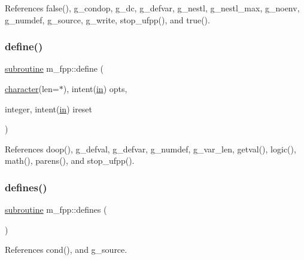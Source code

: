 References false(), g\+\_\+condop, g\+\_\+dc, g\+\_\+defvar, g\+\_\+nestl, g\+\_\+nestl\+\_\+max, g\+\_\+noenv, g\+\_\+numdef, g\+\_\+source, g\+\_\+write, stop\+\_\+ufpp(), and true().

\mbox{\label{namespacem__fpp_a43f195db2d7dcdbaf89cb2e45ca60421}} 
\subsubsection{\texorpdfstring{define()}{define()}}
{\footnotesize\ttfamily \hyperlink{M__stopwatch_83_8txt_acfbcff50169d691ff02d4a123ed70482}{subroutine} m\+\_\+fpp\+::define (\begin{DoxyParamCaption}\item[{\hyperlink{option__stopwatch_83_8txt_abd4b21fbbd175834027b5224bfe97e66}{character}(len=$\ast$), intent(\hyperlink{M__journal_83_8txt_afce72651d1eed785a2132bee863b2f38}{in})}]{opts,  }\item[{integer, intent(\hyperlink{M__journal_83_8txt_afce72651d1eed785a2132bee863b2f38}{in})}]{ireset }\end{DoxyParamCaption})}



References doop(), g\+\_\+defval, g\+\_\+defvar, g\+\_\+numdef, g\+\_\+var\+\_\+len, getval(), logic(), math(), parens(), and stop\+\_\+ufpp().

\mbox{\label{namespacem__fpp_a1db94413ac57479277fa9a5528ea3c26}} 
\subsubsection{\texorpdfstring{defines()}{defines()}}
{\footnotesize\ttfamily \hyperlink{M__stopwatch_83_8txt_acfbcff50169d691ff02d4a123ed70482}{subroutine} m\+\_\+fpp\+::defines (\begin{DoxyParamCaption}{ }\end{DoxyParamCaption})}



References cond(), and g\+\_\+source.

\mbox{\label{namespacem__fpp_a36ad74639f1f01dd0ac08e59e6943778}} 
